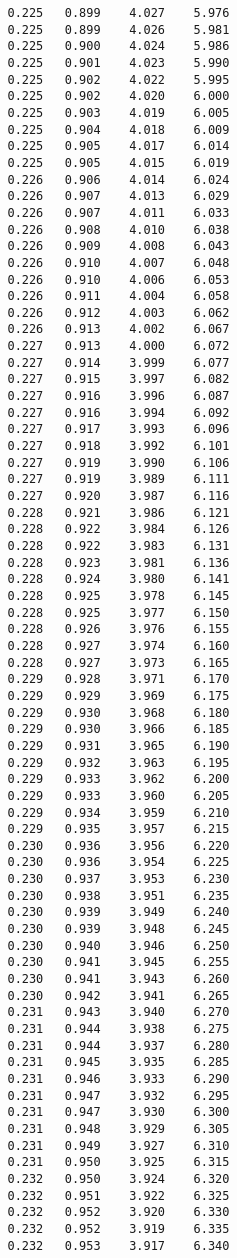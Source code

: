 \begin{verbatim}
   0.225   0.899    4.027    5.976
   0.225   0.899    4.026    5.981
   0.225   0.900    4.024    5.986
   0.225   0.901    4.023    5.990
   0.225   0.902    4.022    5.995
   0.225   0.902    4.020    6.000
   0.225   0.903    4.019    6.005
   0.225   0.904    4.018    6.009
   0.225   0.905    4.017    6.014
   0.225   0.905    4.015    6.019
   0.226   0.906    4.014    6.024
   0.226   0.907    4.013    6.029
   0.226   0.907    4.011    6.033
   0.226   0.908    4.010    6.038
   0.226   0.909    4.008    6.043
   0.226   0.910    4.007    6.048
   0.226   0.910    4.006    6.053
   0.226   0.911    4.004    6.058
   0.226   0.912    4.003    6.062
   0.226   0.913    4.002    6.067
   0.227   0.913    4.000    6.072
   0.227   0.914    3.999    6.077
   0.227   0.915    3.997    6.082
   0.227   0.916    3.996    6.087
   0.227   0.916    3.994    6.092
   0.227   0.917    3.993    6.096
   0.227   0.918    3.992    6.101
   0.227   0.919    3.990    6.106
   0.227   0.919    3.989    6.111
   0.227   0.920    3.987    6.116
   0.228   0.921    3.986    6.121
   0.228   0.922    3.984    6.126
   0.228   0.922    3.983    6.131
   0.228   0.923    3.981    6.136
   0.228   0.924    3.980    6.141
   0.228   0.925    3.978    6.145
   0.228   0.925    3.977    6.150
   0.228   0.926    3.976    6.155
   0.228   0.927    3.974    6.160
   0.228   0.927    3.973    6.165
   0.229   0.928    3.971    6.170
   0.229   0.929    3.969    6.175
   0.229   0.930    3.968    6.180
   0.229   0.930    3.966    6.185
   0.229   0.931    3.965    6.190
   0.229   0.932    3.963    6.195
   0.229   0.933    3.962    6.200
   0.229   0.933    3.960    6.205
   0.229   0.934    3.959    6.210
   0.229   0.935    3.957    6.215
   0.230   0.936    3.956    6.220
   0.230   0.936    3.954    6.225
   0.230   0.937    3.953    6.230
   0.230   0.938    3.951    6.235
   0.230   0.939    3.949    6.240
   0.230   0.939    3.948    6.245
   0.230   0.940    3.946    6.250
   0.230   0.941    3.945    6.255
   0.230   0.941    3.943    6.260
   0.230   0.942    3.941    6.265
   0.231   0.943    3.940    6.270
   0.231   0.944    3.938    6.275
   0.231   0.944    3.937    6.280
   0.231   0.945    3.935    6.285
   0.231   0.946    3.933    6.290
   0.231   0.947    3.932    6.295
   0.231   0.947    3.930    6.300
   0.231   0.948    3.929    6.305
   0.231   0.949    3.927    6.310
   0.231   0.950    3.925    6.315
   0.232   0.950    3.924    6.320
   0.232   0.951    3.922    6.325
   0.232   0.952    3.920    6.330
   0.232   0.952    3.919    6.335
   0.232   0.953    3.917    6.340

\end{verbatim}
